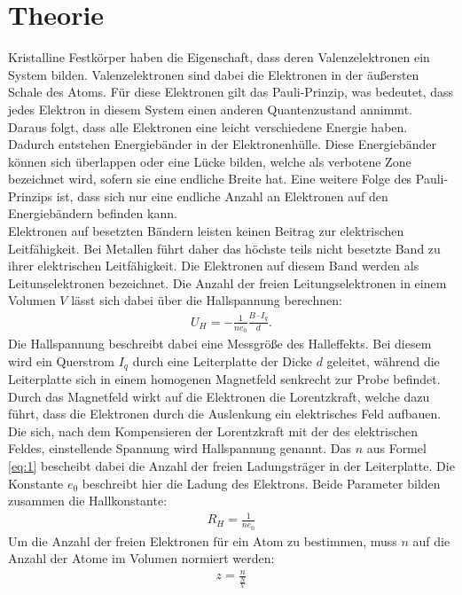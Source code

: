 \section{Theorie} \label{sec:2}\justifying
Kristalline Festkörper haben die Eigenschaft, dass deren Valenzelektronen ein System  bilden.
Valenzelektronen sind dabei die Elektronen in der äußersten Schale des Atoms. 
Für diese Elektronen gilt das Pauli-Prinzip, was bedeutet, dass jedes Elektron
in diesem System einen anderen Quantenzustand annimmt. Daraus folgt, dass alle Elektronen
eine leicht verschiedene Energie haben. Dadurch entstehen Energiebänder in der
Elektronenhülle. Diese Energiebänder können sich überlappen
oder eine Lücke bilden, welche als verbotene Zone bezeichnet wird, sofern sie eine endliche 
Breite hat. Eine weitere Folge des Pauli-Prinzips ist, dass sich nur eine endliche Anzahl
an Elektronen auf den Energiebändern befinden kann. \\
Elektronen auf besetzten Bändern leisten keinen Beitrag zur elektrischen Leitfähigkeit.
Bei Metallen führt daher das höchste teils nicht besetzte Band zu ihrer elektrischen
Leitfähigkeit. Die Elektronen auf diesem Band werden als Leitunselektronen bezeichnet.
Die Anzahl der freien Leitungselektronen in einem Volumen $V$ lässt sich dabei über die Hallspannung
berechnen: \cite{V311}
\begin{align}
    U_H =- \frac{1}{n e_0} \frac{B \cdot I_q}{d}. \label{eq:1}
\end{align}
Die Hallspannung beschreibt dabei eine Messgröße des Halleffekts. Bei diesem wird 
ein Querstrom $I_q$ durch eine Leiterplatte der Dicke $d$ geleitet, während die
Leiterplatte sich in einem homogenen Magnetfeld senkrecht zur Probe befindet. 
Durch das Magnetfeld wirkt auf die Elektronen die Lorentzkraft, welche dazu führt,
dass die Elektronen durch die Auslenkung ein elektrisches Feld aufbauen. Die sich, nach
dem Kompensieren der Lorentzkraft mit der des elektrischen Feldes, einstellende 
Spannung wird Hallspannung genannt. Das $n$ aus Formel \eqref{eq:1} bescheibt dabei die Anzahl
der freien Ladungsträger in der Leiterplatte. Die Konstante $e_0$ beschreibt hier die Ladung des Elektrons.
Beide Parameter bilden zusammen die Hallkonstante: \cite{grosse2016physikalische}
\begin{align}
    R_H = \frac{1}{n e_0} \label{eq:2}
\end{align}
Um die Anzahl der freien Elektronen für ein Atom zu bestimmen, muss $n$ auf die Anzahl der Atome
im Volumen normiert werden:
\begin{align}
    z = \frac{n}{\frac{N}{V}} \label{eq:3}
\end{align}
